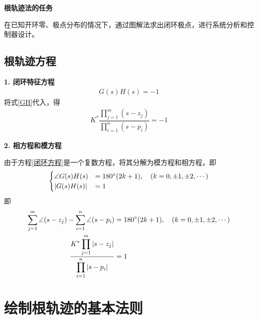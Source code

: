 \noindent \textbf{根轨迹法的任务}

在已知开环零、极点分布的情况下，通过图解法求出闭环极点，进行系统分析和控制器设计。
\vspace*{1em}

\subsection{根轨迹方程}

\noindent \textbf{1. 闭环特征方程}
\begin{align}
	G(s)H(s) = -1
\end{align}
将式\eqref{GH}代入，得
\begin{align}
	K^*\dfrac{\displaystyle \prod_{j = 1}^{m}(s - z_j)}{\displaystyle \prod_{i = 1}^n (s - p_i)} = -1
	\label{闭环方程}
\end{align}

\noindent \textbf{2. 相方程和模方程}

由于方程\eqref{闭环方程}是一个复数方程，将其分解为模方程和相方程，即
\begin{align}
	\begin{cases}
		\displaystyle \angle G(s)H(s) &= 180{}^{\circ}(2k + 1), \quad (k = 0, \pm 1, \pm 2 , \cdots)\\
		\displaystyle |G(s)H(s)| &= 1
	\end{cases}
\end{align}
即
\begin{align}
	\sum_{j = 1}^m \angle(s - z_j) - \sum_{i = 1}^{n} \angle (s - p_i) &= 180{}^{\circ}(2k + 1), \quad (k = 0, \pm 1, \pm 2 , \cdots)\\
	\dfrac{\displaystyle K^* \prod_{j = 1}^{m}|s - z_j|}{\displaystyle \prod_{i = 1}^n |s - p_i|} &= 1 
\end{align}



\section{绘制根轨迹的基本法则\label{根轨迹的基本法则}}
